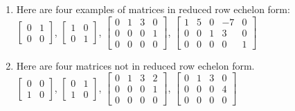 \documentclass[math101_lecturenotes_ku.tex]{subfiles}
\begin{document}
\begin{enumerate}
    \item Here are four examples of matrices in reduced row echelon form: \\[2mm]
$\displaystyle \begin{bmatrix}
    0 & 1 \\
    0 & 0
\end{bmatrix}$, \hspace{8mm}
$\displaystyle \begin{bmatrix}
    1 & 0 \\
    0 & 1
\end{bmatrix}$, \hspace{10mm}
$\displaystyle \begin{bmatrix}
    0 & 1 & 3 & 0 \\
    0 & 0 & 0 & 1 \\
     0 & 0 & 0 & 0
\end{bmatrix}$, \hspace{15mm}
$\displaystyle \begin{bmatrix}
    1 & 5 & 0 & -7 & 0 \\
    0 & 0 & 1 & 3 & 0 \\
     0 & 0 & 0 & 0 & 1
\end{bmatrix}$

\item Here are four matrices not in reduced row echelon form. \\[2mm]
$\displaystyle \begin{bmatrix}
    0 & 0 \\
    1 & 0
\end{bmatrix}$, \hspace{8mm}
$\displaystyle \begin{bmatrix}
    0 & 1 \\
    1 & 0
\end{bmatrix}$, \hspace{10mm}
$\displaystyle \begin{bmatrix}
    0 & 1 & 3 & 2 \\
    0 & 0 & 0 & 1 \\
     0 & 0 & 0 & 0
\end{bmatrix}$, \hspace{15mm}
$\displaystyle \begin{bmatrix}
    0 & 1 & 3 & 0 \\
    0 & 0 & 0 & 4 \\
     0 & 0 & 0 & 0
\end{bmatrix}$
\end{enumerate}
\end{document}
